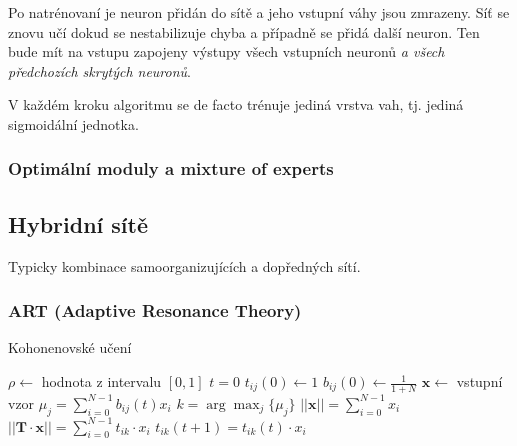 \documentclass[11pt]{report} %
\renewcommand{\vec}[1]{\mathbf{#1}}
\numberwithin{equation}{section}
\begin{document}
Po natrénovaní je neuron přidán do sítě a jeho vstupní váhy jsou zmrazeny. Síť se znovu učí dokud se nestabilizuje chyba a případně se přidá další neuron. Ten bude mít na vstupu zapojeny výstupy všech vstupních neuronů \textit{a všech předchozích skrytých neuronů}.

V každém kroku algoritmu se de facto trénuje jediná vrstva vah, tj. jediná sigmoidální jednotka.

\subsubsection{Optimální moduly a mixture of experts}

\subsection{Hybridní sítě}
Typicky kombinace samoorganizujících a dopředných sítí.

\subsubsection{ART (Adaptive Resonance Theory)}


\bigskip
\begin{algorithm}[H]
	\caption{Kohonenovské učení}
	\begin{algorithmic}[1]
		\State $\rho \gets$ hodnota z intervalu $[0,1]$ 
		\State $t = 0$
				\State $t_{ij}(0) \gets 1$ 
				\State $b_{ij}(0) \gets \frac{1}{1+N}$ 
			\EndFor		
		\EndFor
			\State $\vec{x} \gets$ vstupní vzor 
				\State $\mu_j = \sum_{i=0}^{N-1} b_{ij}(t) x_{i}$ 
			\EndFor
			\State $k = \arg\max_j \{\mu_j\}$ 
			\State $||\vec{x}|| = \sum_{i=0}^{N-1} x_i$
			\State $|| \vec{T}\cdot\vec{x}|| = \sum_{i=0}^{N-1} t_{ik}\cdot x_i$
			\If{$|| \vec{T}\cdot\vec{x}|| / ||\vec{x}|| > \rho$}
				\State $t_{ik}(t+1) = t_{ik}(t)\cdot x_i$
				\State 
			\EndIf
		\EndWhile
		
		\EndFunction
	\end{algorithmic}
\end{algorithm}	
\end{document}
